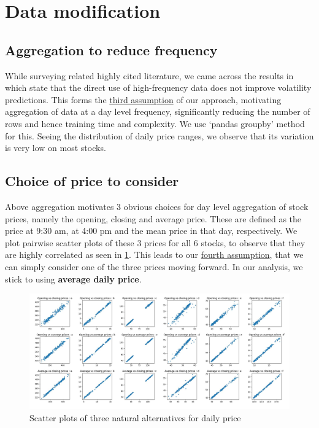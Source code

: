 \documentclass{article}
\begin{document}
\section{Data modification}
\subsection{Aggregation to reduce frequency}
While surveying related highly cited literature, we came across the results in \cite{ghysels2006predicting} which state that the direct use of high-frequency data does not improve volatility predictions. This forms the \underline{third assumption} of our approach, motivating aggregation of data at a day level frequency, significantly reducing the number of rows and hence training time and complexity. We use `pandas groupby' method for this. Seeing the distribution of daily price ranges, we observe that its variation is very low on most stocks.

\subsection{Choice of price to consider}
Above aggregation motivates 3 obvious choices for day level aggregation of stock prices, namely the opening, closing and average price. These are defined as the price at 9:30 am, at 4:00 pm and the mean price in that day, respectively. We plot pairwise scatter plots of these 3 prices for all 6 stocks, to observe that they are highly correlated as seen in \ref{fig5}. This leads to our \underline{fourth assumption}, that we can simply consider one of the three prices moving forward. In our analysis, we stick to using \textbf{average daily price}. 

\begin{figure}[htb]
	\centering
	\includegraphics[width=\textwidth, height=0.39\textwidth]{price_choices.jpg}
	\caption{Scatter plots of three natural alternatives for daily price}
	\label{fig5}
\end{figure}
\end{document}
